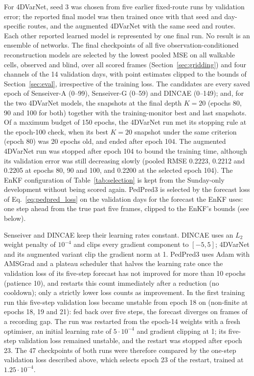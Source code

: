 \documentclass[english, 12pt, a4paper, elec, utf8, a-2b, online]{aaltothesis}
\begin{document}
For 4DVarNet, seed 3 was
chosen from five earlier fixed-route runs by validation error; the reported
final model was then trained once with that seed and day-specific routes, and
the augmented 4DVarNet with the same seed and routes. Each other reported
learned model is represented by one final run. No result is an ensemble of networks.
The final checkpoints of all five observation-conditioned reconstruction models
are selected by the lowest pooled MSE on all walkable cells, observed and blind,
over all scored frames (Section~\ref{sec:gridding}) and four channels of the 14
validation days, with point
estimates clipped to the bounds of Section~\ref{sec:eval}, irrespective of the
training loss. The candidates are every saved epoch of Senseiver\nobreakdash-A (0--99),
Senseiver\nobreakdash-G (0--59) and DINCAE (0--149); and, for the two 4DVarNet models, the
snapshots at the final depth $K = 20$ (epochs 80, 90 and 100 for both) together
with the training-monitor best and last snapshots. Of a maximum budget of 150
epochs, the 4DVarNet run met its stopping rule at the epoch-100 check, when its
best $K = 20$ snapshot under the same criterion (epoch 80) was 20 epochs old,
and ended after epoch 104. The augmented
4DVarNet run was stopped after epoch 104 to bound the training time, although
its validation error was still decreasing slowly (pooled RMSE 0.2223, 0.2212
and 0.2205 at epochs 80, 90 and 100, and 0.2200 at the selected epoch 104).
The EnKF configuration of Table~\ref{tab:selection} is kept from the
Sunday-only development without being scored again. PedPred3 is selected by
the forecast loss of Eq.~\eqref{eq:pedpred_loss} on the validation days for
the forecast the EnKF uses: one step ahead from the true past five frames,
clipped to the EnKF's bounds (see below).

Senseiver and DINCAE keep their learning rates constant. DINCAE uses an
$L_2$ weight penalty of $10^{-4}$ and clips every gradient component to
$[-5, 5]$; 4DVarNet and its augmented variant clip the gradient norm at 1.
PedPred3 uses Adam with AMSGrad and a plateau scheduler that halves the
learning rate once the validation loss of its five-step forecast has not
improved for more than 10 epochs (patience 10), and restarts this count
immediately after a reduction (no cooldown); only a strictly lower loss counts
as improvement.
In the first training run this five-step validation loss became unstable from
epoch 18 on (non-finite at epochs 18, 19 and 21): fed back over five steps, the forecast diverges on frames of
a recording gap. The run was restarted from the epoch-14 weights with a fresh
optimiser, an initial learning rate of $5 \cdot 10^{-4}$ and gradient clipping
at 1; its five-step validation loss remained unstable, and the restart was
stopped after epoch 23. The 47 checkpoints of both runs were therefore compared
by the one-step validation loss described above, which selects epoch 23 of the
restart, trained at $1.25 \cdot 10^{-4}$.
\end{document}
